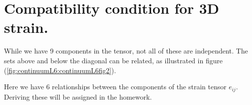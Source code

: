 \section{Compatibility condition for 3D strain.}

While we have 9 components in the tensor, not all of these are independent.  The sets above and below the diagonal can be related, as illustrated in figure (\ref{fig:continuumL6:continuumL6fig2}).


Here we have 6 relationships between the components of the strain tensor $e_{ij}$.  Deriving these will be assigned in the homework.


